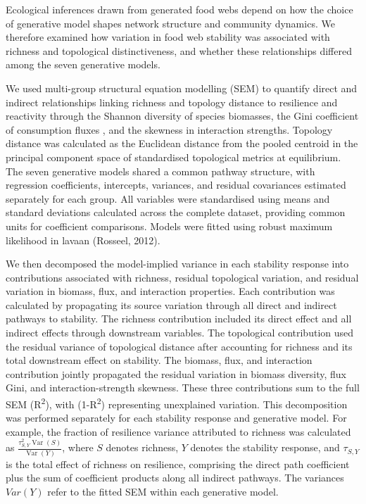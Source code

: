 \documentclass[
]{article}
\begin{document}
Ecological inferences drawn from generated food webs depend on how the
choice of generative model shapes network structure and community
dynamics. We therefore examined how variation in food web stability was
associated with richness and topological distinctiveness, and whether
these relationships differed among the seven generative models.

We used multi-group structural equation modelling (SEM) to quantify
direct and indirect relationships linking richness and topology distance
to resilience and reactivity through the Shannon diversity of species
biomasses, the Gini coefficient of consumption fluxes , and the skewness
in interaction strengths. Topology distance was calculated as the
Euclidean distance from the pooled centroid in the principal component
space of standardised topological metrics at equilibrium. The seven
generative models shared a common pathway structure, with regression
coefficients, intercepts, variances, and residual covariances estimated
separately for each group. All variables were standardised using means
and standard deviations calculated across the complete dataset,
providing common units for coefficient comparisons. Models were fitted
using robust maximum likelihood in lavaan (Rosseel, 2012).

We then decomposed the model-implied variance in each stability response
into contributions associated with richness, residual topological
variation, and residual variation in biomass, flux, and interaction
properties. Each contribution was calculated by propagating its source
variation through all direct and indirect pathways to stability. The
richness contribution included its direct effect and all indirect
effects through downstream variables. The topological contribution used
the residual variance of topological distance after accounting for
richness and its total downstream effect on stability. The biomass,
flux, and interaction contribution jointly propagated the residual
variation in biomass diversity, flux Gini, and interaction-strength
skewness. These three contributions sum to the full SEM
(R\textsuperscript{2}), with (1-R\textsuperscript{2}) representing
unexplained variation. This decomposition was performed separately for
each stability response and generative model. For example, the fraction
of resilience variance attributed to richness was calculated as
\(\frac{\tau_{S,Y}^{2}\operatorname{Var}(S)}{\operatorname{Var}(Y)}\),
where \(S\) denotes richness, \(Y\) denotes the stability response, and
\(\tau_{S,Y}\) is the total effect of richness on resilience, comprising
the direct path coefficient plus the sum of coefficient products along
all indirect pathways. The variances \({Var}(Y)\) refer to the fitted
SEM within each generative model.
\end{document}
